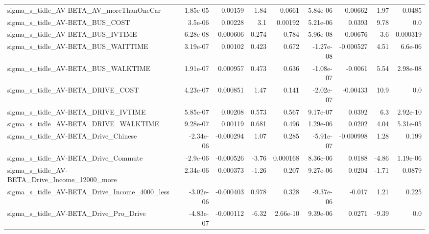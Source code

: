 \begin{tabular}{lrrrrrrrr}
sigma\_s\_tidle\_AV-BETA\_AV\_moreThanOneCar            &    1.85e-05 &      0.00159 &     -1.84 &   0.0661 &   5.84e-06 &     0.00662 &        -1.97 &        0.0485 \\
sigma\_s\_tidle\_AV-BETA\_BUS\_COST                     &     3.5e-06 &      0.00228 &       3.1 &  0.00192 &   5.21e-06 &      0.0393 &         9.78 &           0.0 \\
sigma\_s\_tidle\_AV-BETA\_BUS\_IVTIME                   &    6.28e-08 &     0.000606 &     0.274 &    0.784 &   5.96e-08 &     0.00676 &          3.6 &      0.000319 \\
sigma\_s\_tidle\_AV-BETA\_BUS\_WAITTIME                 &    3.19e-07 &      0.00102 &     0.423 &    0.672 &  -1.27e-08 &   -0.000527 &         4.51 &       6.6e-06 \\
sigma\_s\_tidle\_AV-BETA\_BUS\_WALKTIME                 &    1.91e-07 &     0.000957 &     0.473 &    0.636 &  -1.08e-07 &     -0.0061 &         5.54 &      2.98e-08 \\
sigma\_s\_tidle\_AV-BETA\_DRIVE\_COST                   &    4.23e-07 &     0.000851 &      1.47 &    0.141 &  -2.02e-07 &    -0.00433 &         10.9 &           0.0 \\
sigma\_s\_tidle\_AV-BETA\_DRIVE\_IVTIME                 &    5.85e-07 &      0.00208 &     0.573 &    0.567 &   9.17e-07 &      0.0392 &          6.3 &      2.92e-10 \\
sigma\_s\_tidle\_AV-BETA\_DRIVE\_WALKTIME               &    9.28e-07 &      0.00119 &     0.681 &    0.496 &   1.29e-06 &      0.0202 &         4.04 &      5.31e-05 \\
sigma\_s\_tidle\_AV-BETA\_Drive\_Chinese                &   -2.34e-06 &    -0.000294 &      1.07 &    0.285 &  -5.91e-07 &   -0.000998 &         1.28 &         0.199 \\
sigma\_s\_tidle\_AV-BETA\_Drive\_Commute                &    -2.9e-06 &    -0.000526 &     -3.76 & 0.000168 &   8.36e-06 &      0.0188 &        -4.86 &      1.19e-06 \\
sigma\_s\_tidle\_AV-BETA\_Drive\_Income\_12000\_more      &    2.34e-06 &     0.000373 &     -1.26 &    0.207 &   9.27e-06 &      0.0204 &        -1.71 &        0.0879 \\
sigma\_s\_tidle\_AV-BETA\_Drive\_Income\_4000\_less       &   -3.02e-06 &    -0.000403 &     0.978 &    0.328 &  -9.37e-06 &      -0.017 &         1.21 &         0.225 \\
sigma\_s\_tidle\_AV-BETA\_Drive\_Pro\_Drive              &   -4.83e-07 &    -0.000112 &     -6.32 & 2.66e-10 &   9.39e-06 &      0.0271 &        -9.39 &           0.0 \\

\end{tabular}
